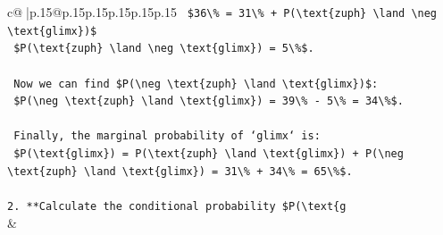 \documentclass{article}
\begin{document}
{\begin{supertabular}{c@{$\;$}|p{.15\linewidth}@{}p{.15\linewidth}p{.15\linewidth}p{.15\linewidth}p{.15\linewidth}p{.15\linewidth}}
{{{\texttt{    \$36\textbackslash{}\% = 31\textbackslash{}\% + P(\textbackslash{}text\{zuph\} \textbackslash{}land \textbackslash{}neg \textbackslash{}text\{glimx\})\$} \\
\texttt{    \$P(\textbackslash{}text\{zuph\} \textbackslash{}land \textbackslash{}neg \textbackslash{}text\{glimx\}) = 5\textbackslash{}\%\$.} \\
\\ 
\texttt{    Now we can find \$P(\textbackslash{}neg \textbackslash{}text\{zuph\} \textbackslash{}land \textbackslash{}text\{glimx\})\$:} \\
\texttt{    \$P(\textbackslash{}neg \textbackslash{}text\{zuph\} \textbackslash{}land \textbackslash{}text\{glimx\}) = 39\textbackslash{}\% {-} 5\textbackslash{}\% = 34\textbackslash{}\%\$.} \\
\\ 
\texttt{    Finally, the marginal probability of `glimx` is:} \\
\texttt{    \$P(\textbackslash{}text\{glimx\}) = P(\textbackslash{}text\{zuph\} \textbackslash{}land \textbackslash{}text\{glimx\}) + P(\textbackslash{}neg \textbackslash{}text\{zuph\} \textbackslash{}land \textbackslash{}text\{glimx\}) = 31\textbackslash{}\% + 34\textbackslash{}\% = 65\textbackslash{}\%\$.} \\
\\ 
\texttt{2.  **Calculate the conditional probability \$P(\textbackslash{}text\{g} \\
            }
        }
    }
    & \\ \\


\end{supertabular}}
\end{document}

